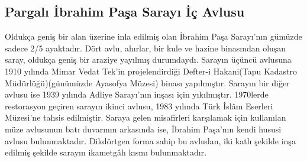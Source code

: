\subsection{Pargalı İbrahim Paşa Sarayı İç Avlusu}
\indent\indent Oldukça geniş bir alan üzerine inla edilmiş olan İbrahim Paşa Sarayı'nın gümüzde sadece 2/5 ayaktadır. Dört avlu, ahırlar, bir kule ve hazine binasından oluşan saray, oldukça geniş bir araziye yayılmış durumdaydı. Sarayın üçüncü avlusuna 1910 yılında Mimar Vedat Tek'in projelendirdiği Defter-i Hakani(Tapu Kadastro Müdürlüğü)(günümüzde Ayasofya Müzesi) binası yapılmıştır. Sarayın bir diğer avlusu ise 1939 yılında Adliye Sarayı'nın inşası için yıkılmıştır. 1970lerde restorasyon geçiren sarayın ikinci avlusu, 1983 yılında Türk İslâm Eserleri Müzesi'ne tahsis edilmiştir. Saraya gelen misafirleri karşılamak için kullanılan müze avlusunun batı duvarının arkasında ise, İbrahim Paşa'nın kendi hususi avlusu bulunmaktadır. Dikdörtgen forma sahip bu avludan, iki katlı şekilde inşa edilmiş şekilde sarayın ikametgâh kısmı bulunmaktadır.